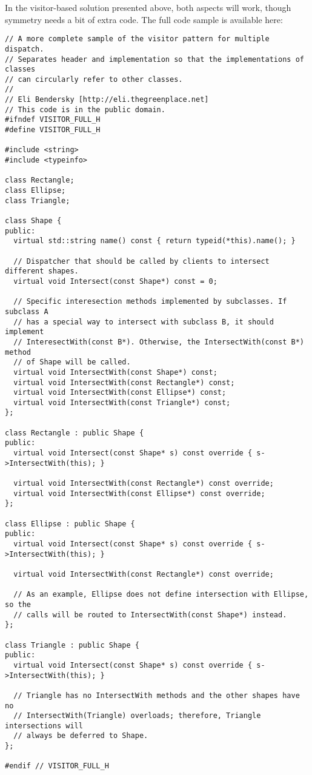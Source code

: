 \documentclass{book}
\begin{document}
In the visitor-based solution presented above, both aspects will work, though symmetry needs a bit of extra code.
The full code sample is available here: 
\begin{lstlisting}
// A more complete sample of the visitor pattern for multiple dispatch.
// Separates header and implementation so that the implementations of classes
// can circularly refer to other classes.
//
// Eli Bendersky [http://eli.thegreenplace.net]
// This code is in the public domain.
#ifndef VISITOR_FULL_H
#define VISITOR_FULL_H

#include <string>
#include <typeinfo>

class Rectangle;
class Ellipse;
class Triangle;

class Shape {
public:
  virtual std::string name() const { return typeid(*this).name(); }

  // Dispatcher that should be called by clients to intersect different shapes.
  virtual void Intersect(const Shape*) const = 0;

  // Specific interesection methods implemented by subclasses. If subclass A
  // has a special way to intersect with subclass B, it should implement
  // InteresectWith(const B*). Otherwise, the IntersectWith(const B*) method
  // of Shape will be called.
  virtual void IntersectWith(const Shape*) const;
  virtual void IntersectWith(const Rectangle*) const;
  virtual void IntersectWith(const Ellipse*) const;
  virtual void IntersectWith(const Triangle*) const;
};

class Rectangle : public Shape {
public:
  virtual void Intersect(const Shape* s) const override { s->IntersectWith(this); }

  virtual void IntersectWith(const Rectangle*) const override;
  virtual void IntersectWith(const Ellipse*) const override;
};

class Ellipse : public Shape {
public:
  virtual void Intersect(const Shape* s) const override { s->IntersectWith(this); }

  virtual void IntersectWith(const Rectangle*) const override;

  // As an example, Ellipse does not define intersection with Ellipse, so the
  // calls will be routed to IntersectWith(const Shape*) instead.
};

class Triangle : public Shape {
public:
  virtual void Intersect(const Shape* s) const override { s->IntersectWith(this); }

  // Triangle has no IntersectWith methods and the other shapes have no
  // IntersectWith(Triangle) overloads; therefore, Triangle intersections will
  // always be deferred to Shape.
};

#endif // VISITOR_FULL_H
\end{lstlisting}
\end{document}
